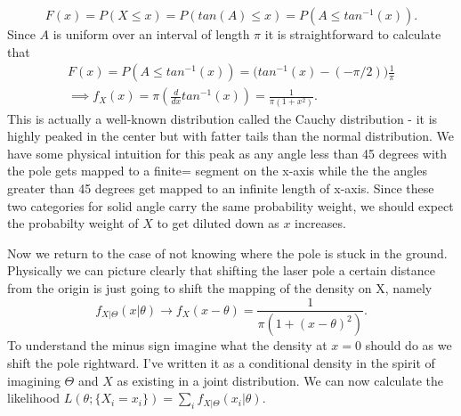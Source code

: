 \begin{equation}
F(x) = P(X \leq x) = P(tan(A) \leq x) = P(A \leq tan^{-1}(x)).
\end{equation}
Since $A$ is uniform over an interval of length $\pi$ it is straightforward to calculate that
\begin{align*}
F(x) = P(A \leq tan^{-1}(x)) = \bigg(tan^{-1}(x) - (-\pi/2)\bigg)\frac{1}{\pi}\\
\implies f_X(x) =\pi( \frac{d}{dx}tan^{-1}(x))=\frac{1}{\pi(1+x^2)}.
\end{align*}
This is actually a well-known distribution called the Cauchy distribution - it is highly peaked in the center but with fatter tails than the normal distribution. We have some physical intuition for this peak as any angle less than 45 degrees with the pole gets mapped to a finite= segment on the x-axis while the the angles greater than 45 degrees get mapped to an infinite length of x-axis. Since these two categories for solid angle carry the same probability weight, we should expect the probabilty weight of $X$ to get diluted down as $x$ increases. 
\n

Now we return to the case of not knowing where the pole is stuck in the ground. Physically we can picture clearly that shifting the laser pole a certain distance from the origin is just going to shift the mapping of the density on X, namely
\begin{equation}
f_{X|\Theta}(x|\theta) \rightarrow f_X(x-\theta) = \frac{1}{\pi(1+(x-\theta)^2)}.
\end{equation}
To understand the minus sign imagine what the density at $x=0$ should do as we shift the pole rightward. I've written it as a conditional density in the spirit of imagining $\Theta$ and $X$ as existing in a joint distribution. We can now calculate the likelihood $L(\theta ; \{X_i=x_i\})=\sum_i f_{X|\Theta}(x_i|\theta)$. 

